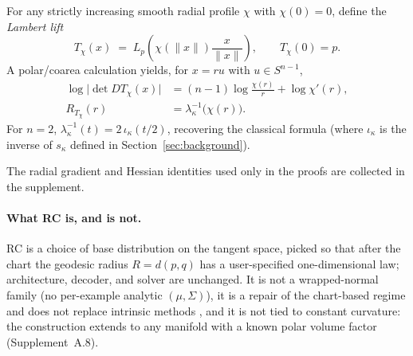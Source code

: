 \documentclass{article}
\theoremstyle{definition}
\theoremstyle{remark}
\begin{document}
For any strictly increasing smooth radial profile $\chi$ with $\chi(0)=0$, define the
\emph{Lambert lift}
\begin{equation}
  T_\chi(x)
  \;=\;
  L_p\!\left(\chi(\|x\|)\frac{x}{\|x\|}\right),
  \qquad
  T_\chi(0)=p.
  \label{eq:lambert-lift-proof}
\end{equation}
A polar/coarea calculation yields, for $x=ru$ with $u\in S^{n-1}$,
\begin{equation}
\begin{aligned}
\log\bigl|\det DT_\chi(x)\bigr|
&=
(n-1)\log\frac{\chi(r)}{r} + \log\chi'(r), \\
R_{T_\chi}(r)
&=
\lambda_\kappa^{-1}\!\bigl(\chi(r)\bigr).
\end{aligned}
\label{eq:lambert-jac-distance}
\end{equation}
For $n=2$, $\lambda_\kappa^{-1}(t) = 2\,\iota_\kappa(t/2)$,
recovering the classical formula (where $\iota_\kappa$ is the inverse of
$s_\kappa$ defined in Section~\ref{sec:background}).

The radial gradient and Hessian identities used only in the proofs are collected in the supplement.





\paragraph{What RC is, and is not.} RC is a choice of base distribution on the tangent space, picked so that after the chart the geodesic radius $R=d(p,q)$ has a user-specified one-dimensional law; architecture, decoder, and solver are unchanged. It is not a wrapped-normal family (no per-example analytic $(\mu,\Sigma)$), it is a repair of the chart-based regime and does not replace intrinsic methods \citep{mathieu2020riemannian,lou2020neural}, and it is not tied to constant curvature: the construction extends to any manifold with a known polar volume factor (Supplement~A.8).
\end{document}
